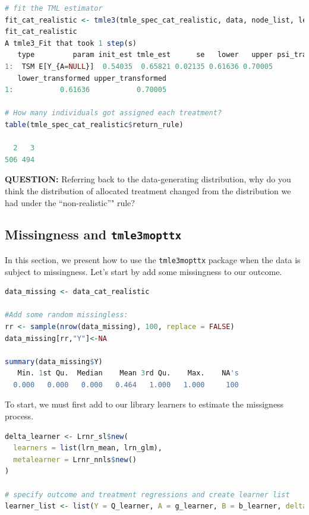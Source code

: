 \documentclass[
  12pt, krantz2,
]{krantz}
\newcommand{\passthrough}[1]{#1}
\theoremstyle{definition}
\theoremstyle{definition}
\theoremstyle{definition}
\newcommand{\1}{\mathbbm{1}}
\begin{document}
\begin{lstlisting}[language=R]
# fit the TML estimator
fit_cat_realistic <- tmle3(tmle_spec_cat_realistic, data, node_list, learner_list)
fit_cat_realistic
A tmle3_Fit that took 1 step(s)
   type         param init_est tmle_est      se   lower   upper psi_transformed
1:  TSM E[Y_{A=NULL}]  0.54035  0.65821 0.02135 0.61636 0.70005         0.65821
   lower_transformed upper_transformed
1:           0.61636           0.70005

# How many individuals got assigned each treatment?
table(tmle_spec_cat_realistic$return_rule)

  2   3 
506 494 
\end{lstlisting}

\textbf{QUESTION:} Referring back to the data-generating distribution, why do you
think the distribution of allocated treatment changed from the distribution
we had under the ``non-realistic''" rule?

\hypertarget{missingness-and-tmle3mopttx}{%
\subsection{\texorpdfstring{Missingness and \texttt{tmle3mopttx}}{Missingness and tmle3mopttx}}\label{missingness-and-tmle3mopttx}}

In this section, we present how to use the \passthrough{\lstinline!tmle3mopttx!} package when the data is subject
to missingness. Let's start by add some missingness to our outcome.

\begin{lstlisting}[language=R]
data_missing <- data_cat_realistic

#Add some random missingless:
rr <- sample(nrow(data_missing), 100, replace = FALSE)
data_missing[rr,"Y"]<-NA

summary(data_missing$Y)
   Min. 1st Qu.  Median    Mean 3rd Qu.    Max.    NA's 
  0.000   0.000   0.000   0.464   1.000   1.000     100 
\end{lstlisting}

To start, we must first add to our library learners to estimate the missigness
process.

\begin{lstlisting}[language=R]
delta_learner <- Lrnr_sl$new(
  learners = list(lrn_mean, lrn_glm),
  metalearner = Lrnr_nnls$new()
)

# specify outcome and treatment regressions and create learner list
learner_list <- list(Y = Q_learner, A = g_learner, B = b_learner, delta_Y=delta_learner)
\end{lstlisting}
\end{document}

